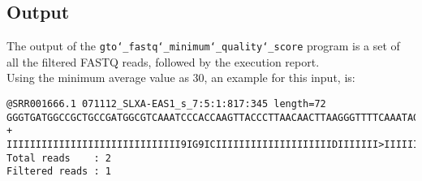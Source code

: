 \subsection*{Output}
The output of the \texttt{gto\char`_fastq\char`_minimum\char`_quality\char`_score} program is a set of all the filtered FASTQ reads, followed by the execution report.\\
Using the minimum average value as 30, an example for this input, is:
\begin{lstlisting}
@SRR001666.1 071112_SLXA-EAS1_s_7:5:1:817:345 length=72
GGGTGATGGCCGCTGCCGATGGCGTCAAATCCCACCAAGTTACCCTTAACAACTTAAGGGTTTTCAAATAGA
+
IIIIIIIIIIIIIIIIIIIIIIIIIIIIII9IG9ICIIIIIIIIIIIIIIIIIIIIDIIIIIII>IIIIII/
Total reads    : 2
Filtered reads : 1
\end{lstlisting}
